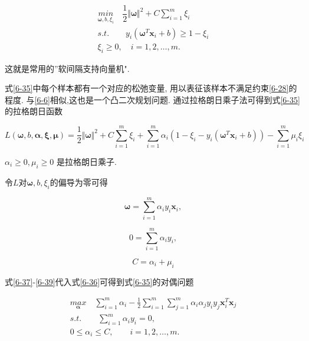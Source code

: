 \documentclass[12pt]{article}
\numberwithin{equation}{section}%
\begin{document}
\begin{equation}
\begin{split}
{\underset{\boldsymbol{\omega},b,\xi_{i}}{min}} \quad \dfrac{1}{2}\Vert \boldsymbol{\omega}\Vert^{2}+C\sum_{i=1}^{m}\xi_{i}  \\
s.t.	\qquad    y_{i}(\boldsymbol{\omega}^{T}\boldsymbol{x}_{i} + b) \geqslant 1-\xi_{i}         \\
\xi_{i} \geqslant 0, \quad i=1,2, \ldots, m.
\end{split}
\label{6-35}
\end{equation}

这就是常用的''软间隔支持向量机".

式\ref{6-35}中每个样本都有一个对应的松弛变量, 用以表征该样本不满足约束\ref{6-28}的程度. 与\ref{6-6}相似,这也是一个凸二次规划问题. 通过拉格朗日乘子法可得到式\ref{6-35}的拉格朗日函数

\begin{equation}
L(\boldsymbol{\omega}, b, \boldsymbol{\alpha}, \boldsymbol{\xi}, \boldsymbol{\mu}) = \frac{1}{2}\Vert \boldsymbol{\omega} \Vert ^{2} + C\sum_{i=1}^{m}\xi_{i} + \sum_{i=1}^{m}\alpha_{i}(1 - \xi_{i} - y_{i}(\boldsymbol{\omega}^{T}\boldsymbol{x}_{i} + b)) - \sum_{i=1}^{m}\mu_{i}\xi_{i}
\label{6-36}
\end{equation}

$\alpha_{i} \geqslant 0, \mu_{i} \geqslant 0$ 是拉格朗日乘子.

令$L$对$\boldsymbol{\omega}, b,\xi_{i}$的偏导为零可得

\begin{equation}
\boldsymbol{\omega} = \sum_{i=1}^{m} \alpha_{i}y_{i}\boldsymbol{x}_{i} ,
\label{6-37}
\end{equation}

\begin{equation}
0 = \sum_{i=1}^{m}\alpha_{i}y_{i} ,
\label{6-38}
\end{equation}

\begin{equation}
C = \alpha_{i} + \mu_{i}
\label{6-39}
\end{equation}

式\ref{6-37}-\ref{6-39}代入式\ref{6-36}可得到式\ref{6-35}的对偶问题

\begin{equation}
\begin{split}
{\underset{\boldsymbol{\alpha}}{max}} \quad \sum_{i=1}^{m}\alpha_{i} - \frac{1}{2} \sum_{i=1}^{m}\sum_{j=1}^{m}\alpha_{i}\alpha_{j}y_{i}y_{j}\boldsymbol{x}_{i}^{T}\boldsymbol{x}_{j}      \\
s.t.  \qquad  \sum_{i=1}^{m}\alpha_{i}y_{i} = 0,            \\
0 \leqslant \alpha_{i} \leqslant C, \qquad i =1, 2, \ldots, m.  
\end{split}
\label{6-40}
\end{equation}
\end{document}
